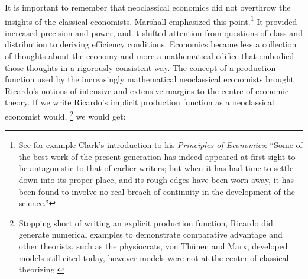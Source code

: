 
It is important to remember that neoclassical economics did not overthrow the insights of the classical economists. Marshall emphasized this point.\footnote{See for example Clark's introduction to his \textit{Principles of Economics}: ``Some of the best work of the present generation has indeed appeared at first sight to be antagonistic to that of earlier writers; but when it has had time to settle down into its proper place, and its rough edges have been worn away, it has been found to involve no real breach of continuity in the development of the science.''} It provided increased precision and power, and it shifted attention from questions of class and distribution to deriving efficiency conditions. Economics became less a collection of thoughts about the economy and more a mathematical edifice that embodied those thoughts in a rigorously consistent way. 
The concept of a production function used by the increasingly mathematical neoclassical economists brought Ricardo's notions of  intensive and extensive margins to the centre of economic theory. If we write Ricardo's implicit production function as a neoclassical economist would, \footnote{
Stopping short of writing an explicit production function, Ricardo did generate numerical examples to demonstrate comparative advantage and other theorists, such as the physiocrats, von Th\"unen and Marx, developed models still cited today, however models were not at the center of classical theorizing.} we would get:

